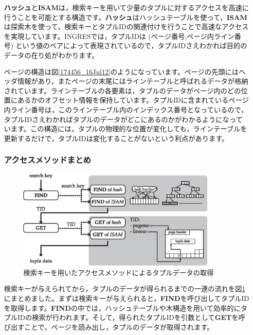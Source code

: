 {\bf ハッシュ}と{\bf ISAM}は，検索キーを用いて少量のタプルに対するアクセスを高速に行うことを可能とする構造です。{\bf ハッシュ}はハッシュテーブルを使って，{\bf ISAM}は探索木を使って，検索キーとタプルIDの関連付けを行うことで高速なアクセスを実現しています。INGRESでは，タプルIDは (ページ番号,ページ内ライン番号) という値のペアによって表現されているので，タプルIDさえわかれば目的のデータの在り処がわかります。


ページの構造は図\ref{174456_16Jul12}のようになっています。ページの先頭にはヘッダ情報があり，またページの末尾にはラインテーブルと呼ばれるデータが格納されています。ラインテーブルの各要素は，タプルのデータがページ内のどの位置にあるかのオフセット情報を保持しています。タプルIDに含まれているページ内ライン番号は，このラインテーブル内のインデックス番号となっているので，タプルIDさえわかればタプルのデータがどこにあるのかがわかるようになっています。この構造には，タプルの物理的な位置が変化しても，ラインテーブルを更新するだけで，タプルIDは変化することがないという利点があります。


\subsubsection{アクセスメソッドまとめ}


\begin{figure}
 \begin{center}
  \includegraphics[width=100mm]{images/access-method.eps}
  \caption{検索キーを用いたアクセスメソッドによるタプルデータの取得}
  \label{190817_16Jul12}
 \end{center}
\end{figure}


検索キーが与えられてから，タプルのデータが得られるまでの一連の流れを図\ref{190817_16Jul12}にまとめました。まずは検索キーが与えられると，{\bf FIND}を呼び出してタプルIDを取得します。{\bf FIND}の中では，ハッシュテーブルや木構造を用いて効率的にタプルIDの検索が行われます。そして，得られたタプルIDを引数として{\bf GET}を呼び出すことで，ページを読み出し，タプルのデータが取得されます。


